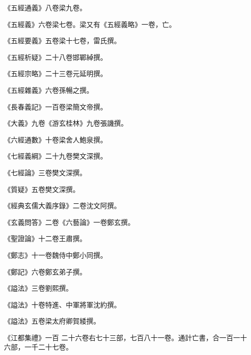 \begin{pinyinscope}
 《五經通義》八卷梁九卷。



 《五經義》六卷梁七卷。梁又有《五經義略》一卷，亡。



 《五經要義》五卷梁十七卷，雷氏撰。



 《五經析疑》二十八卷邯鄲綽撰。



 《五經宗略》二十三卷元延明撰。



 《五經雜義》六卷孫暢之撰。



 《長春義記》一百卷梁簡文帝撰。



 《大義》九卷《游玄桂林》九卷張譏撰。



 《六經通數》十卷梁舍人鮑泉撰。



 《七經義綱》二十九卷樊文深撰。



 《七經論》三卷樊文深撰。



 《質疑》五卷樊文深撰。



 《經典玄儒大義序錄》二卷沈文阿撰。



 《玄義問答》二卷《六藝論》一卷鄭玄撰。



 《聖證論》十二卷王肅撰。



 《鄭志》十一卷魏侍中鄭小同撰。



 《鄭記》六卷鄭玄弟子撰。



 《謚法》三卷劉熙撰。



 《謚法》十卷特進、中軍將軍沈約撰。



 《謚法》五卷梁太府卿賀緌撰。



 《江都集禮》一百
 二十六卷右七十三部，七百八十一卷。通計亡書，合一百一十六部，一千二十七卷。




\end{pinyinscope}
